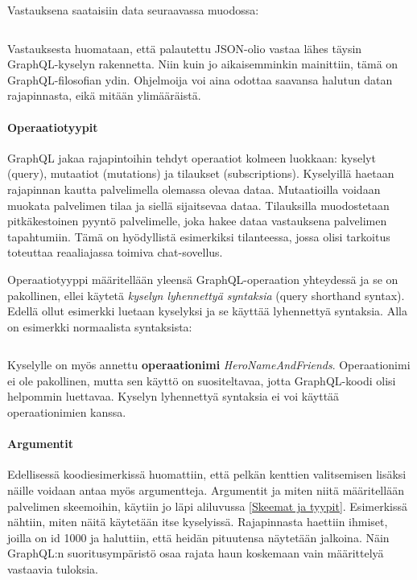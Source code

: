 Vastauksena saataisiin data seuraavassa muodossa:

\inputminted{json}{listaukset/esimerkki1.json}

Vastauksesta huomataan, että palautettu JSON-olio vastaa lähes täysin GraphQL-kyselyn rakennetta. Niin kuin jo aikaisemminkin mainittiin, tämä on GraphQL-filosofian ydin. Ohjelmoija voi aina odottaa saavansa halutun datan rajapinnasta, eikä mitään ylimääräistä. \cite{QueriesAndMutations}

\paragraph{Operaatiotyypit} GraphQL jakaa rajapintoihin tehdyt operaatiot kolmeen luokkaan: kyselyt (query), mutaatiot (mutations) ja tilaukset (subscriptions). Kyselyillä haetaan rajapinnan kautta palvelimella olemassa olevaa dataa. Mutaatioilla voidaan muokata palvelimen tilaa ja siellä sijaitsevaa dataa. Tilauksilla muodostetaan pitkäkestoinen pyyntö palvelimelle, joka hakee dataa vastauksena palvelimen tapahtumiin. Tämä on hyödyllistä esimerkiksi tilanteessa, jossa olisi tarkoitus toteuttaa reaaliajassa toimiva chat-sovellus. \cite{graphql-spec}

Operaatiotyyppi määritellään yleensä GraphQL-operaation yhteydessä ja se on pakollinen, ellei käytetä \textit{kyselyn lyhennettyä syntaksia} (query shorthand syntax). Edellä ollut esimerkki luetaan kyselyksi ja se käyttää lyhennettyä syntaksia. Alla on esimerkki normaalista syntaksista:

\inputminted{gql.py:GraphQLLexer -x}{listaukset/esimerkki3.graphql}

Kyselylle on myös annettu \textbf{operaationimi} \textit{HeroNameAndFriends}. Operaationimi ei ole pakollinen, mutta sen käyttö on suositeltavaa, jotta GraphQL-koodi olisi helpommin luettavaa. Kyselyn lyhennettyä syntaksia ei voi käyttää operaationimien kanssa. \cite{graphql-spec} \cite{QueriesAndMutations}

\paragraph{Argumentit} Edellisessä koodiesimerkissä huomattiin, että pelkän kenttien valitsemisen lisäksi näille voidaan antaa myös argumentteja. Argumentit ja miten niitä määritellään palvelimen skeemoihin, käytiin jo läpi aliluvussa \ref{Skeemat ja tyypit}. Esimerkissä nähtiin, miten näitä käytetään itse kyselyissä. Rajapinnasta haettiin ihmiset, joilla on id 1000 ja haluttiin, että heidän pituutensa näytetään jalkoina. Näin GraphQL:n suoritusympäristö osaa rajata haun koskemaan vain määrittelyä vastaavia tuloksia.

